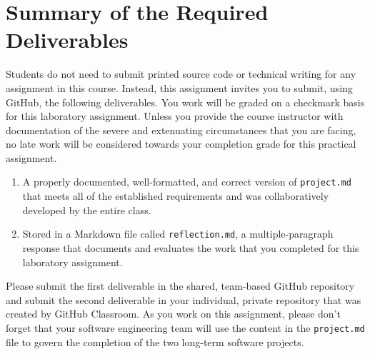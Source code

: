 \documentclass[11pt]{article}
\newcommand{\project}{\lstinline{project.md}}
\newcommand{\reflection}{\lstinline{reflection.md}}
\newcommand{\checkmark}{\ding{51}}
\newcommand{\naughtmark}{\ding{55}}
\begin{document}


\section*{Summary of the Required Deliverables}

\noindent Students do not need to submit printed source code or technical
writing for any assignment in this course. Instead, this assignment invites you
to submit, using GitHub, the following deliverables. You work will be graded on
a checkmark basis for this laboratory assignment.
%
Unless you provide the course instructor with documentation of the severe and
extenuating circumstances that you are facing, no late work will be considered
towards your completion grade for this practical assignment.

\begin{enumerate}

\setlength{\itemsep}{-.01in}

\item A properly documented, well-formatted, and correct version of \project{}
  that meets all of the established requirements and was collaboratively
  developed by the entire class.

\item Stored in a Markdown file called \reflection{}, a multiple-paragraph
  response that documents and evaluates the work that you completed for this
  laboratory assignment.

\end{enumerate}

\noindent Please submit the first deliverable in the shared, team-based GitHub
repository and submit the second deliverable in your individual, private
repository that was created by GitHub Classroom. As you work on this assignment,
please don't forget that your software engineering team will use the content in
the \project{} file to govern the completion of the two long-term software
projects.
\end{document}
